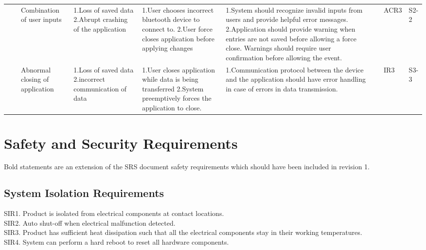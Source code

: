 \documentclass{article}
\begin{document}
\begin{table}[H]
\begin{tabular}{| p{} | p{}  | p{} | p{} | p{} | p{} | p{} | p{} | p{} |}
     & & Combination of user inputs & 1.Loss of saved data \newline 2.Abrupt crashing of the application  &  1.User chooses incorrect bluetooth device to connect to. \newline 2.User force closes application before applying changes  &  1.System should recognize invalid inputs from users and provide helpful error messages. \newline 2.Application should provide warning when entries are not saved before allowing a force close. Warnings should require user confirmation before allowing the event.  &  & ACR3 & S2-2 \\ \cline{3-9}

     & & Abnormal closing of application & 1.Loss of saved data \newline 2.incorrect communication of data  & 1.User closes application while data is being transferred \newline 2.System preemptively forces the application to close. & 1.Communication protocol between the device and the application should have error handling in case of errors in data transmission.  & & IR3 & S3-3 \\ \hline
    
    \end{tabular}
    \hspace*{-1cm}
    \end{table}

\newpage 
\section{Safety and Security Requirements}

Bold statements are an extension of the SRS document safety requirements which should have been included in revision 1.

\subsection{System Isolation Requirements}

SIR1. Product is isolated from electrical components at contact locations.
\\SIR2. Auto shut-off when electrical malfunction detected.
\\SIR3. Product has sufficient heat dissipation such that all the electrical components stay in their working temperatures.
\\SIR4. System can perform a hard reboot to reset all hardware components.
\end{document}
